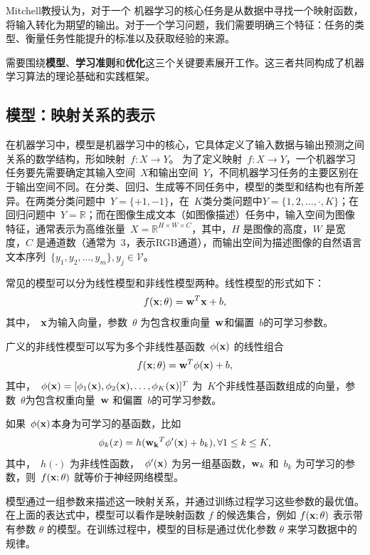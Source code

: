 Mitchell教授认为，对于一个
机器学习的核心任务是从数据中寻找一个映射函数，将输入转化为期望的输出。对于一个学习问题，我们需要明确三个特征：任务的类型、衡量任务性能提升的标准以及获取经验的来源。

需要围绕{\bf 模型}、{\bf 学习准则}和{\bf 优化}这三个关键要素展开工作。这三者共同构成了机器学习算法的理论基础和实践框架。

\subsection{模型：映射关系的表示}

在机器学习中，模型是机器学习中的核心，它具体定义了输入数据与输出预测之间关系的数学结构，形如映射~$f: X \rightarrow Y$。
为了定义映射~$f: X \rightarrow Y$，一个机器学习任务要先需要确定其输入空间~$X$和输出空间~$Y$，不同机器学习任务的主要区别在于输出空间不同。在分类、回归、生成等不同任务中，模型的类型和结构也有所差异。在两类分类问题中~$Y = \{+1,−1\}$，在~$K$类分类问题中$Y =\{1, 2,\dots,· , K\}$；在回归问题中~$Y = \mathbb{R}$；而在图像生成文本（如图像描述）任务中，输入空间为图像特征，通常表示为高维张量~$X=\mathbb{R}^{H\times W\times C}$，其中，$H$ 是图像的高度，$W$ 是宽度，$C$ 是通道数（通常为~$3$，表示RGB通道），而输出空间为描述图像的自然语言文本序列~$\{y_1,y_2,\dots, y_m \}, y_j\in \mathcal{V}$。


常见的模型可以分为线性模型和非线性模型两种。线性模型的形式如下：
$$
f({\bf x}; \theta)= {\bf w}^T{\bf x} +b, 
$$
其中，~${\bf x}$为输入向量，参数~$\theta$ 为包含权重向量~${\bf w}$和偏置~$b$的可学习参数。

广义的非线性模型可以写为多个非线性基函数~$\phi({\bf x})$ 的线性组合
\begin{equation*}\label{ref}
f({\bf x}; \theta) = {\bf w}^T {\bf \phi}({\bf x}) + b, 
\end{equation*}
其中，~$\phi({\bf x}) = [ \phi_1({\bf x}),\phi_2({\bf x}),\dots ,\phi_K({\bf x})]^T$ 为~$K$个非线性基函数组成的向量，参数~$\theta$为包含权重向量~${\bf w}$ 和偏置~$b$的可学习参数。

如果~$\phi({\bf x})$本身为可学习的基函数，比如
\begin{equation*}
\phi_k(x) = h({\bf w_k}^T\phi^\prime({\bf x}) + b_k), \forall 1 \le  k \le K,
\end{equation*}  
其中，~$h(\cdot)$ 为非线性函数，~$\phi^\prime ({\bf x})$ 为另一组基函数，${\bf w}_k$ 和~$b_k$ 为可学习的参数，则~$f ({\bf x};\theta)$ 就等价于神经网络模型。

模型通过一组参数来描述这一映射关系，并通过训练过程学习这些参数的最优值。在上面的表达式中，模型可以看作是映射函数 $f$ 的候选集合，例如 $f ({\bf x};\theta)$ 表示带有参数 $\theta$ 的模型。在训练过程中，模型的目标是通过优化参数 $\theta$ 来学习数据中的规律。

